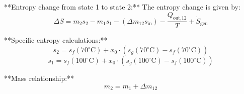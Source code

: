 **Entropy change from state 1 to state 2:**  
The entropy change is given by:  
\[
\Delta S = m_2 s_2 - m_1 s_1 - \left( \Delta m_{12} s_{\text{in}} \right) - \frac{Q_{\text{out,12}}}{T} + \dot{S}_{\text{gen}}
\]  

**Specific entropy calculations:**  
\[
s_2 = s_f(70^\circ\text{C}) + x_0 \cdot \left( s_g(70^\circ\text{C}) - s_f(70^\circ\text{C}) \right)
\]  
\[
s_1 = s_f(100^\circ\text{C}) + x_0 \cdot \left( s_g(100^\circ\text{C}) - s_f(100^\circ\text{C}) \right)
\]  

**Mass relationship:**  
\[
m_2 = m_1 + \Delta m_{12}
\]